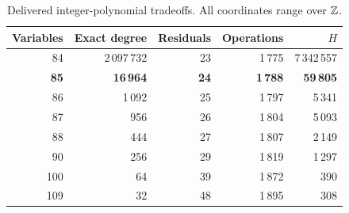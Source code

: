 \begin{table}[htbp]
\centering
\caption{Delivered integer-polynomial tradeoffs. All coordinates range over $\mathbb Z$.}
\label{tab:metrics}
\small
\begin{tabular}{rrrrr}
\toprule
Variables & Exact degree & Residuals & Operations & $H$\\
\midrule
84 & 2\,097\,732 & 23 & 1\,775 & 7\,342\,557\\
\textbf{85} & \textbf{16\,964} & \textbf{24} & \textbf{1\,788} & \textbf{59\,805}\\
86 & 1\,092 & 25 & 1\,797 & 5\,341\\
87 & 956 & 26 & 1\,804 & 5\,093\\
88 & 444 & 27 & 1\,807 & 2\,149\\
90 & 256 & 29 & 1\,819 & 1\,297\\
100 & 64 & 39 & 1\,872 & 390\\
109 & 32 & 48 & 1\,895 & 308\\
\bottomrule
\end{tabular}
\end{table}
